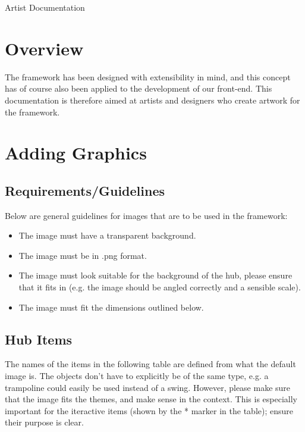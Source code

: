 \documentclass[a4paper,12pt]{article}
\begin{document}
\begin{center}
{\Huge Artist Documentation}
\end{center}

\section{Overview}

The framework has been designed with extensibility in mind, and this concept has of course also been applied to the development of our front-end. This documentation is therefore aimed at artists and designers who create artwork for the framework.

\section{Adding Graphics}

\subsection{Requirements/Guidelines}
Below are general guidelines for images that are to be used in the framework:

\begin{itemize}
	\item The image must have a transparent background.
	\item The image must be in .png format.
	\item The image must look suitable for the background of the hub, please ensure that it fits in (e.g. the image should be angled correctly and a sensible scale).
	\item The image must fit the dimensions outlined below.
\end{itemize}

\subsection{Hub Items}

The names of the items in the following table are defined from what the default image is. The objects don't have to explicitly be of the same type, e.g. a trampoline could easily be used instead of a swing. However, please make sure that the image fits the themes, and make sense in the context. This is especially important for the iteractive items (shown by the * marker in the table); ensure their purpose is clear.
\end{document}
